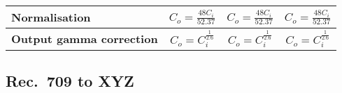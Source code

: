 \documentclass{article}
\begin{document}
\begin{minipage}{\textwidth}
\begin{tabular}{|l|c|c|c|}
\hline
\textbf{Normalisation} &
\parbox[c][4em][c]{3cm}{ \(\displaystyle C_o = \frac{48 C_i}{52.37}\)} &
\parbox[c][4em][c]{3cm}{ \(\displaystyle C_o = \frac{48 C_i}{52.37}\)} &
\parbox[c][4em][c]{3cm}{ \(\displaystyle C_o = \frac{48 C_i}{52.37}\)} \\

\hline
\parbox[c][2em][c]{2cm}{\textbf{Output gamma correction}} &
\parbox[c][4em][c]{3cm}{\(\displaystyle C_o = C_i^{\frac{1}{2.6}} \)} &
\parbox[c][4em][c]{3cm}{\(\displaystyle C_o = C_i^{\frac{1}{2.6}} \)} &
\parbox[c][4em][c]{3cm}{\(\displaystyle C_o = C_i^{\frac{1}{2.6}} \)} \\
\hline

\end{tabular}
\end{minipage}




\subsection{Rec.\ 709 to XYZ}
\end{document}
